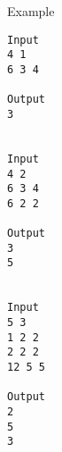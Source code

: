 Example
\begin{verbatim}
Input
4 1
6 3 4

Output
3


Input
4 2
6 3 4
6 2 2

Output
3
5


Input
5 3
1 2 2
2 2 2
12 5 5

Output
2
5
3
\end{verbatim}